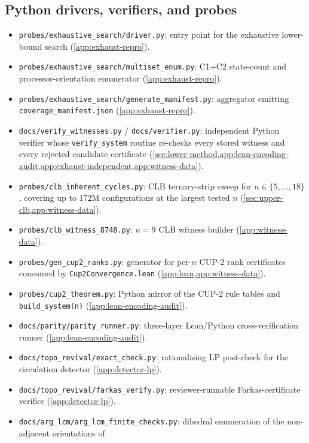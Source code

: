 \documentclass[11pt,a4paper]{article}
\theoremstyle{plain}
\theoremstyle{definition}
\begin{document}
\subsection{Python drivers, verifiers, and probes}\label{app:manifest-python}
\begin{itemize}[leftmargin=*]
\item \texttt{probes/exhaustive\_search/driver.py}: entry point
 for the exhaustive lower-bound search
 (\cref{app:exhaust-repro}).
\item \texttt{probes/exhaustive\_search/multiset\_enum.py}:
 C1+C2 state-count and processor-orientation enumerator
 (\cref{app:exhaust-repro}).
\item \texttt{probes/exhaustive\_search/generate\_manifest.py}:
 aggregator emitting \texttt{coverage\_manifest.json}
 (\cref{app:exhaust-repro}).
\item \texttt{docs/verify\_witnesses.py} / \texttt{docs/verifier.py}: independent Python verifier whose \texttt{verify\_system}
 routine re-checks every stored witness and every rejected
 candidate certificate (\cref{sec:lower-method,app:lean-encoding-audit,app:exhaust-independent,app:witness-data}).
\item \texttt{probes/clb\_inherent\_cycles.py}: CLB
 ternary-strip sweep for $n \in \{5, \ldots, 18\}$, covering up to
 $172$M configurations at the largest tested $n$
 (\cref{sec:upper-clb,app:witness-data}).
\item \texttt{probes/clb\_witness\_8748.py}: $n = 9$ CLB witness
 builder (\cref{app:witness-data}).
\item \texttt{probes/gen\_cup2\_ranks.py}: generator for per-$n$
 CUP-2 rank certificates consumed by
 \texttt{Cup2Convergence.lean} (\cref{app:lean,app:witness-data}).
\item \texttt{probes/cup2\_theorem.py}: Python mirror of the
 CUP-2 rule tables and \texttt{build\_system(n)}
 (\cref{app:lean-encoding-audit}).
\item \texttt{docs/parity/parity\_runner.py}:
 three-layer Lean/Python cross-verification runner
 (\cref{app:lean-encoding-audit}).
\item \texttt{docs/topo\_revival/exact\_check.py}:
 rationalising LP post-check for the circulation detector
 (\cref{app:detector-lp}).
\item \texttt{docs/topo\_revival/farkas\_verify.py}:
 reviewer-runnable Farkas-certificate verifier
 (\cref{app:detector-lp}).
\item \texttt{docs/arg\_lcm/arg\_lcm\_finite\_checks.py}: dihedral enumeration of the non-adjacent orientations of

\end{itemize}
\end{document}
